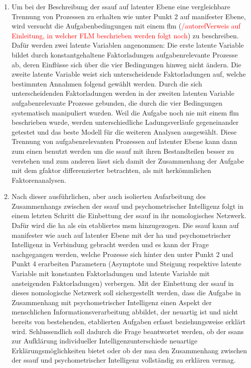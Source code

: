 \documentclass[11pt, twoside, a4paper]{book}		%
\begin{document}
\begin{enumerate}
	\item Um bei der Beschreibung der \gls{ssauf} auf latenter Ebene eine vergleichbare Trennung von Prozessen zu erhalten wie unter Punkt 2 auf manifester Ebene, wird versucht die Aufgabenbedingungen mit einem \gls{flm} (\textcolor{red}{/autoref{Verweis auf Einleitung, in welcher FLM beschrieben werden folgt noch}}) zu beschreiben. 
	Dafür werden zwei latente Variablen angenommen: Die erste latente Variable bildet durch konstantgehaltene Faktorladungen aufgabenrelevante Prozesse ab, deren Einflüsse sich über die vier Bedingungen hinweg nicht ändern. 
	Die zweite latente Variable weist sich unterscheidende Faktorladungen auf, welche  bestimmten Annahmen folgend gewählt werden.
	Durch die sich unterscheidenden Faktorladungen werden in der zweiten latenten Variable aufgabenrelevante Prozesse gebunden, die durch die vier Bedingungen systematisch manipuliert wurden. Weil die Aufgabe noch nie mit einem \gls{flm} beschrieben wurde, werden unterschiedliche Ladungsverläufe gegeneinander getestet und das beste Modell für die weiteren Analysen ausgewählt.
	Diese Trennung von aufgabenrelevanten Prozessen auf latenter Ebene kann dann zum einen benutzt werden um die \gls{ssauf} mit ihren Bestandteilen besser zu verstehen und zum anderen lässt sich damit der Zusammenhang  der Aufgabe mit dem \gls{gfaktor} differenzierter betrachten, als mit herkömmlichen Faktorenanalysen.


	\item Nach dieser ausführlichen, aber auch isolierten Aufarbeitung des Zusammenhangs zwischen der \gls{ssauf} und psychometrischer Intelligenz folgt in einem letzten Schritt die Einbettung der \gls{ssauf} in ihr nomologisches Netzwerk. Dafür wird die \gls{ha} als ein etabliertes \gls{msm} hinzugezogen. Die \gls{ssauf} kann auf manifester wie auch auf latenter Ebene mit der \gls{ha} und psychometrischer Intelligenz in Verbindung gebracht werden und es kann der Frage nachgegangen werden, welche Prozesse sich hinter den unter Punkt 2 und Punkt 4 erarbeiten Parametern (Asymptote und Steigung respektive latente Variable mit konstanten Faktorladungen und latente Variable mit ansteigenden Faktorladungen) verbergen. Mit der Einbettung der \gls{ssauf} in dieses nomologische Netzwerk soll sichergestellt werden, dass die Aufgabe in Zusammenhang mit psychometrischer Intelligenz einen Aspekt der menschlichen Informationsverarbeitung abbildet, der neuartig ist und nicht bereits von bestehenden, etablierten Aufgaben erfasst beziehungsweise erklärt wird. Schlussendlich soll dadurch die Frage beantwortet werden, ob der \gls{ssans} zur Aufklärung individueller Intelligenzunterschiede neuartige Erklärungsmöglichkeiten bietet oder ob der \gls{msa} den Zusammenhang zwischen der \gls{ssauf} und psychometrischer Intelligenz vollständig zu erklären vermag.

\end{enumerate}
\end{document}
